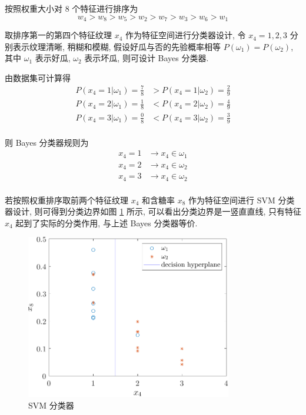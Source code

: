 \documentclass[openany]{ctexbook}
\theoremstyle{kaiti}
\theoremstyle{normal}
\begin{document}
按照权重大小对 8 个特征进行排序为
\begin{equation}
  w_4>w_8>w_5>w_2>w_7>w_3>w_6>w_1
\end{equation}

取排序第一的第四个特征纹理 $x_4$ 作为特征空间进行分类器设计, 令 $x_4=1,2,3$ 分别表示纹理清晰, 稍糊和模糊, 假设好瓜与否的先验概率相等 $P(\omega_1)=P(\omega_2)$, 其中 $\omega_1$ 表示好瓜, $\omega_2$ 表示坏瓜, 则可设计 Bayes 分类器.

由数据集可计算得
\begin{equation}
  \begin{aligned}
    P(x_4=1|\omega_1)=\frac{7}{8}&>P(x_4=1|\omega_2)=\frac{2}{9}\\
    P(x_4=2|\omega_1)=\frac{1}{8}&<P(x_4=2|\omega_2)=\frac{4}{9}\\
    P(x_4=3|\omega_1)=\frac{0}{8}&<P(x_4=3|\omega_2)=\frac{3}{9}\\
  \end{aligned}
\end{equation}

则 Bayes 分类器规则为
\begin{equation}
  \begin{aligned}
    x_4=1&\to x_4\in\omega_1\\
    x_4=2&\to x_4\in\omega_2\\
    x_4=3&\to x_4\in\omega_2\\
  \end{aligned}
\end{equation}

若按照权重排序取前两个特征纹理 $x_4$ 和含糖率 $x_8$ 作为特征空间进行 SVM 分类器设计, 则可得到分类边界如图 \ref{fig:featureSVM} 所示, 可以看出分类边界是一竖直直线, 只有特征 $x_4$ 起到了实际的分类作用, 与上述 Bayes 分类器等价.

\begin{figure}[htbp]
  \centering
  \includegraphics[width=9cm]{featureSVM.pdf}
  \caption{SVM 分类器}
  \label{fig:featureSVM}
\end{figure}
\end{document}
